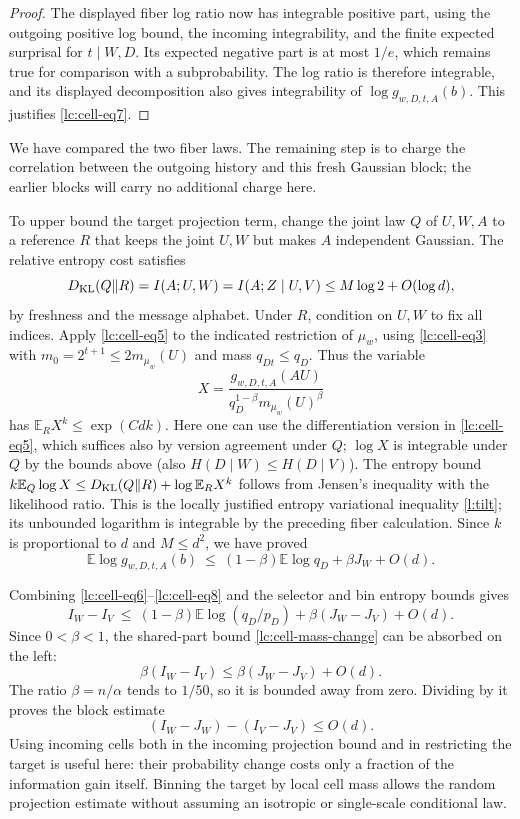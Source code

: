 \begin{proof}
The displayed fiber log ratio now has integrable positive part, using
the outgoing positive log bound, the incoming integrability, and the
finite expected surprisal for \(t\mid W,D\). Its expected negative
part is at most \(1/e\), which remains true for comparison with a
subprobability. The log ratio is therefore integrable, and its
displayed decomposition also gives integrability of
\(\log g_{w,D,t,A}(b)\). This justifies \eqref{lc:cell-eq7}.
\end{proof}

We have compared the two fiber laws. The remaining step is to charge the correlation between the outgoing history and this fresh Gaussian block; the earlier blocks will carry no additional charge here.

To upper bound the target projection term, change the joint law \(Q\) of \(U,W,A\) to a reference \(R\) that keeps the joint \(U,W\) but makes \(A\) independent Gaussian. The relative entropy cost satisfies
\[
 D_{\rm KL}(Q\|R)=I(A;U,W)=I(A;Z\mid U,V)\le M\log 2+O(\log d),
\]
by freshness and the message alphabet. Under \(R\), condition on \(U,W\) to fix all indices. Apply \eqref{lc:cell-eq5} to the indicated restriction of \(\mu_w\), using \eqref{lc:cell-eq3} with \(m_0=2^{t+1}\le 2 m_{\mu_w}(U)\) and mass \(q_{Dt}\le q_D\). Thus the variable
\[
 X=\frac{g_{w,D,t,A}(AU)}
         {q_D^{1-\beta}m_{\mu_w}(U)^\beta}
\]
has \(\mathbb E_R X^k\le \exp(Cdk)\). Here one can use the differentiation version in \eqref{lc:cell-eq5}, which suffices also by version agreement under \(Q\); \(\log X\) is integrable under \(Q\) by the bounds above (also \(H(D\mid W)\le H(D\mid V)\)). The entropy bound \(k\mathbb E_Q\log X\le D_{\rm KL}(Q\|R)+\log\mathbb E_R X^k\) follows from Jensen's inequality with the likelihood ratio. This is the locally justified entropy variational inequality \eqref{l:tilt}; its unbounded logarithm is integrable by the preceding fiber calculation. Since \(k\) is proportional to \(d\) and \(M\le d^2\), we have proved
\begin{equation}\label{lc:cell-eq8}
\mathbb E\log g_{w,D,t,A}(b)
 \ \le\ (1-\beta)\mathbb E\log q_D + \beta J_W + O(d).
\end{equation}

Combining \eqref{lc:cell-eq6}--\eqref{lc:cell-eq8} and the selector and bin entropy bounds gives
\[
 I_W-I_V\ \le\ (1-\beta)\mathbb E\log(q_D/p_D)
                    +\beta(J_W-J_V)+O(d).
\]
Since \(0<\beta<1\), the shared-part bound
\eqref{lc:cell-mass-change} can be absorbed on the left:
\[
 \beta(I_W-I_V)\le \beta(J_W-J_V)+O(d).
\]
The ratio \(\beta=n/\alpha\) tends to \(1/50\), so it is bounded
away from zero. Dividing by it proves the block estimate
\begin{equation}\label{lc:cell-eq9}
(I_W-J_W) - (I_V-J_V) \le O(d).
\end{equation}
Using incoming cells both in the incoming projection bound and in restricting the target is useful here: their probability change costs only a fraction of the information gain itself. Binning the target by local cell mass allows the random projection estimate without assuming an isotropic or single-scale conditional law.

